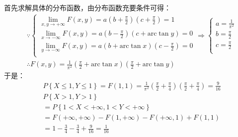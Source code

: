 首先求解具体的分布函数，由分布函数充要条件可得：
\begin{align*}
&\because \begin{cases}
	\underset{x,y\rightarrow +\infty}{\lim}F\left( x,y \right) =a\left( b+\frac{\pi}{2} \right) \left( c+\frac{\pi}{2} \right) =1\\
	\underset{x\rightarrow -\infty}{\lim}F\left( x,y \right) =a\left( b-\frac{\pi}{2} \right) \left( c+\mathrm{arc}\tan y \right) =0\\
	\underset{y\rightarrow -\infty}{\lim}F\left( x,y \right) =a\left( b+\mathrm{arc}\tan x \right) \left( c-\frac{\pi}{2} \right) =0\\
\end{cases}\Rightarrow \begin{cases}
	a=\frac{1}{\pi ^2}\\
	b=\frac{\pi}{2}\\
	c=\frac{\pi}{2}\\
\end{cases} \\
&\therefore F\left( x,y \right) =\frac{1}{\pi ^2}\left( \frac{\pi}{2}+\mathrm{arc}\tan x \right) \left( \frac{\pi}{2}+\mathrm{arc}\tan y \right)
\end{align*}
于是：
\begin{align*}
&P\left\{ X\leqslant 1,Y\leqslant 1 \right\} =F\left( 1,1 \right) =\frac{1}{\pi ^2}\left( \frac{\pi}{2}+\frac{\pi}{4} \right) \left( \frac{\pi}{2}+\frac{\pi}{4} \right) =\frac{9}{16} \\
&P\left\{ X>1,Y>1 \right\} \\
&=P\left\{ 1<X<+\infty ,1<Y<+\infty \right\} \\
&=F\left( +\infty ,+\infty \right) -F\left( 1,+\infty \right) -F\left( +\infty ,1 \right) +F\left( 1,1 \right) \\
&=1-\frac{3}{4}-\frac{3}{4}+\frac{9}{16}=\frac{1}{16}
\end{align*}




